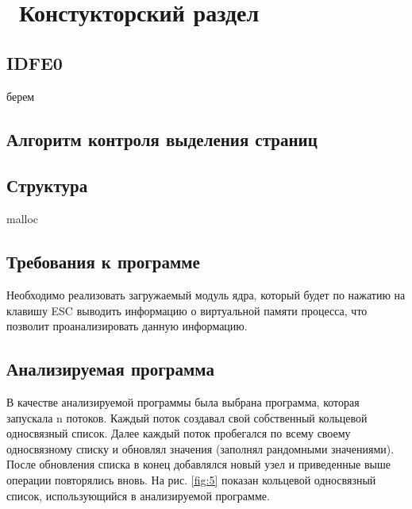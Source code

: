 \chapter{ Констукторский раздел}
\label{cha:design}

\section{IDFE0}

берем

\section{Алгоритм контроля выделения страниц}



\section{Структура}

malloc 

\section{Требования к программе}

Необходимо реализовать загружаемый модуль ядра, который будет 
по нажатию на клавишу ESC выводить информацию о виртуальной памяти процесса,
что позволит проанализировать данную информацию.



\section{Анализируемая программа}

В качестве анализируемой программы  была выбрана программа, 
которая запускала n потоков. 
Каждый поток создавал свой собственный кольцевой односвязный список.
Далее каждый поток пробегался по всему своему односвязному списку 
и обновлял значения (заполнял рандомными значениями).
После обновления списка в конец добавлялся новый узел 
и приведенные выше операции повторялись вновь. 
На рис. \ref{fig:5} показан кольцевой односвязный список, использующийся в анализируемой программе.

\begin{figure}[ht!]
\end{figure}

